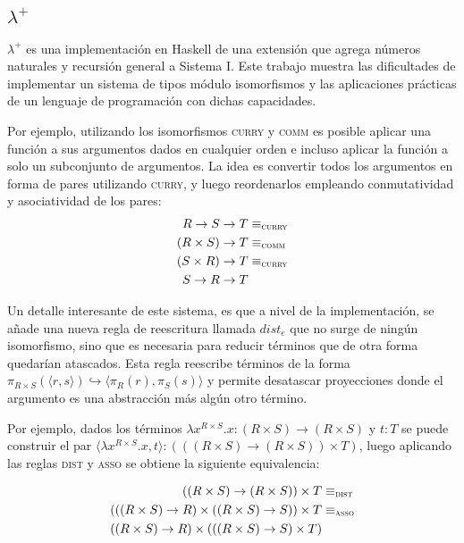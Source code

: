 \subsection{$\lambda^+$}
$\lambda^+$ \cite{lambda-plus} es una implementación en Haskell de una extensión que agrega números naturales y recursión general a Sistema I.
Este trabajo muestra las dificultades de implementar un sistema de tipos módulo isomorfismos y las aplicaciones prácticas de un lenguaje de programación con dichas capacidades.

Por ejemplo, utilizando los isomorfismos \textsc{curry} y \textsc{comm} es posible aplicar una función a sus argumentos dados en cualquier orden e incluso aplicar la función a solo un subconjunto de  argumentos.
La idea es convertir todos los argumentos en forma de pares utilizando \textsc{curry}, y luego reordenarlos empleando conmutatividad y asociatividad de los pares:
\begin{align*}
	R \rightarrow S \rightarrow T& \equiv_\textsc{curry} \\
	(R \times S) \rightarrow T& \equiv_\textsc{comm} \\
	(S \times R) \rightarrow T& \equiv_\textsc{curry} \\
	S \rightarrow R \rightarrow T& 
\end{align*}

Un detalle interesante de este sistema, es que a nivel de la implementación, se añade una nueva regla de reescritura llamada $dist_e$ que no surge de ningún isomorfismo, sino que es necesaria para reducir términos que de otra forma quedarían atascados.
Esta regla reescribe términos de la forma
$\pi_{R \times S}(\langle r,s \rangle) \hookrightarrow \langle \pi_R(r), \pi_S(s) \rangle$
y permite desatascar proyecciones donde el argumento es una abstracción más algún otro término.

Por ejemplo, dados los términos $\lambda x^{R \times S}.x: (R \times S) \rightarrow (R \times S)$ y $t : T$ se puede construir el par $\langle \lambda x^{R \times S}.x, t \rangle: (((R \times S) \rightarrow (R \times S)) \times T)$, luego aplicando las reglas \textsc{dist} y \textsc{asso} se obtiene la siguiente equivalencia:

\begin{align*}
	((R \times S) \rightarrow (R \times S)) \times T& \equiv_\textsc{dist} \\
	(((R \times S) \rightarrow R) \times ((R \times S) \rightarrow S)) \times T& \equiv_\textsc{asso} \\
	((R \times S) \rightarrow R) \times (((R \times S) \rightarrow S) \times T)& 
\end{align*}

